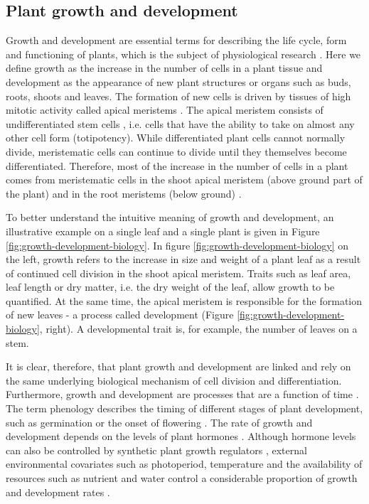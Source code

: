 \subsection{Plant growth and development}
\label{subsec:intro-plant-growth-dev}

Growth and development are essential terms for describing the life cycle, form and functioning of plants, which is the subject of physiological research \citep{leopold_plant_1964}. Here we define growth as the increase in the number of cells in a plant tissue and development as the appearance of new plant structures or organs such as buds, roots, shoots and leaves. The formation of new cells is driven by tissues of high mitotic activity called apical meristems \citep{sinnott_growth_1939}. The apical meristem consists of undifferentiated stem cells \citep{bowman_formation_2000}, i.e. cells that have the ability to take on almost any other cell form (totipotency). While differentiated plant cells cannot normally divide, meristematic cells can continue to divide until they themselves become differentiated. Therefore, most of the increase in the number of cells in a plant comes from meristematic cells in the shoot apical meristem (above ground part of the plant) and in the root meristems (below ground) \citep{kerstetter_shoot_1997}.

To better understand the intuitive meaning of growth and development, an illustrative example on a single leaf and a single plant is given in Figure \ref{fig:growth-development-biology}. In figure \ref{fig:growth-development-biology} on the left, growth refers to the increase in size and weight of a plant leaf as a result of continued cell division in the shoot apical meristem. Traits such as leaf area, leaf length or dry matter, i.e. the dry weight of the leaf, allow growth to be quantified. At the same time, the apical meristem is responsible for the formation of new leaves - a process called development (Figure \ref{fig:growth-development-biology}, right). A developmental trait is, for example, the number of leaves on a stem.

It is clear, therefore, that plant growth and development are linked and rely on the same underlying biological mechanism of cell division and differentiation. Furthermore, growth and development are processes that are a function of time \citep{prusinkiewicz_modeling_2004}. The term phenology describes the timing of different stages of plant development, such as germination or the onset of flowering \citep{piao_plant_2019}. The rate of growth and development depends on the levels of plant hormones \citep{shani_role_2006}. Although hormone levels can also be controlled by synthetic plant growth regulators \citep{gaspar_plant_1996}, external environmental covariates such as photoperiod, temperature \citep{porter_temperatures_1999} and the availability of resources such as nutrient and water control a considerable proportion of growth and development rates \citep{masle_competition_1985,korner_paradigm_2015}.

